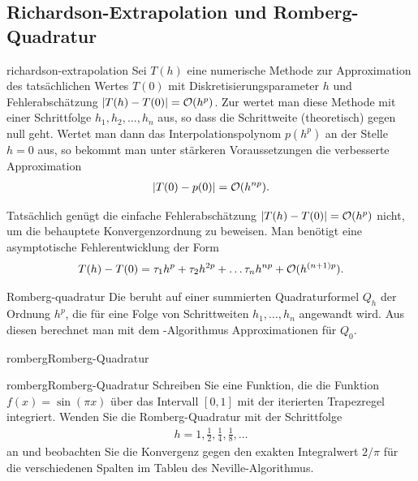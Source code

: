 \subsection{Richardson-Extrapolation und Romberg-Quadratur}

\begin{Definition}{richardson-extrapolation}
  Sei $T(h)$ eine numerische Methode zur Approximation des
  tatsächlichen Wertes $T(0)$ mit Diskretisierungsparameter $h$ und
  Fehlerabschätzung $\lvert T(h)-T(0)\rvert = \mathcal O(h^p)$. Zur
   wertet man diese Methode mit einer
  Schrittfolge $h_1, h_2,\ldots,h_n$ aus, so dass die Schrittweite
  (theoretisch) gegen null geht. Wertet man dann das
  Interpolationspolynom $p(h^p)$ an der Stelle $h=0$ aus, so bekommt
  man unter stärkeren Voraussetzungen die verbesserte Approximation
  \begin{gather}
    \lvert T(0)-p(0)\rvert = \mathcal O(h^{np}).
  \end{gather}
\end{Definition}

\begin{remark}
  Tatsächlich genügt die einfache Fehlerabschätzung
  $\lvert T(h)-T(0)\rvert = \mathcal O(h^p)$ nicht, um die behauptete
  Konvergenzordnung zu beweisen. Man benötigt eine asymptotische
  Fehlerentwicklung der Form
  \begin{gather}
    T(h)-T(0) = \tau_1 h^p + \tau_2 h^{2p} + \dots \tau_n h^{np}
    + \mathcal O(h^{(n+1)p}).
  \end{gather}
\end{remark}

\begin{Definition}{Romberg-quadratur}
  Die  beruht auf einer summierten
  Quadraturformel $Q_h$ der Ordnung $h^p$, die für eine Folge von
  Schrittweiten $h_1,\dots, h_n$ angewandt wird. Aus diesen berechnet
  man mit dem -Algorithmus Approximationen für
  $Q_0$.
\end{Definition}

\begin{Algorithmus*}{romberg}{Romberg-Quadratur}
  
\end{Algorithmus*}

\begin{Aufgabe*}{romberg}{Romberg-Quadratur}
  Schreiben Sie eine Funktion, die die Funktion $f(x) = \sin(\pi x)$
  über das Intervall $[0,1]$ mit der iterierten Trapezregel
  integriert. Wenden Sie die Romberg-Quadratur mit der Schrittfolge
  \begin{gather}
    h = 1,\frac12,\frac14,\frac18,\dots
  \end{gather}
  an und beobachten Sie die Konvergenz gegen den exakten Integralwert
  $2/\pi$ für die verschiedenen Spalten im Tableu des
  Neville-Algorithmus.
\end{Aufgabe*}

